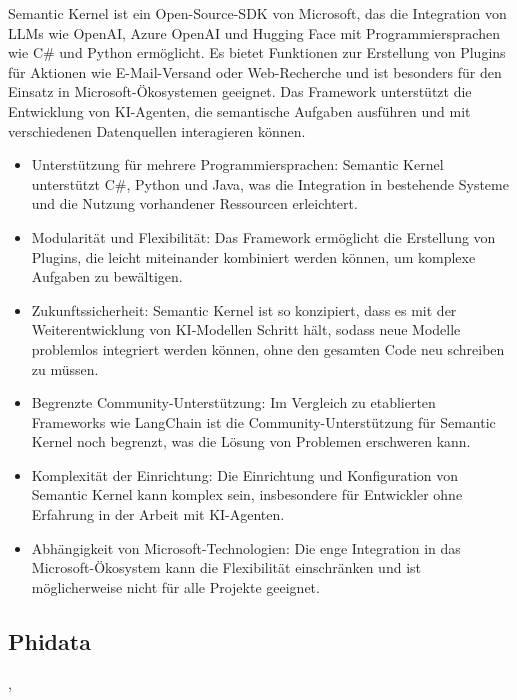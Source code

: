 Semantic Kernel ist ein Open-Source-SDK von Microsoft, das die Integration von LLMs wie OpenAI, Azure OpenAI und Hugging Face mit Programmiersprachen wie C\# und Python ermöglicht. Es bietet Funktionen zur Erstellung von Plugins für Aktionen wie E-Mail-Versand oder Web-Recherche und ist besonders für den Einsatz in Microsoft-Ökosystemen geeignet. Das Framework unterstützt die Entwicklung von KI-Agenten, die semantische Aufgaben ausführen und mit verschiedenen Datenquellen interagieren können.

\begin{itemize}
    \item Unterstützung für mehrere Programmiersprachen: Semantic Kernel unterstützt C\#, Python und Java, was die Integration in bestehende Systeme und die Nutzung vorhandener Ressourcen erleichtert.

    \item Modularität und Flexibilität: Das Framework ermöglicht die Erstellung von Plugins, die leicht miteinander kombiniert werden können, um komplexe Aufgaben zu bewältigen.

    \item Zukunftssicherheit: Semantic Kernel ist so konzipiert, dass es mit der Weiterentwicklung von KI-Modellen Schritt hält, sodass neue Modelle problemlos integriert werden können, ohne den gesamten Code neu schreiben zu müssen.
\end{itemize}

\begin{itemize}
    \item Begrenzte Community-Unterstützung: Im Vergleich zu etablierten Frameworks wie LangChain ist die Community-Unterstützung für Semantic Kernel noch begrenzt, was die Lösung von Problemen erschweren kann.

    \item Komplexität der Einrichtung: Die Einrichtung und Konfiguration von Semantic Kernel kann komplex sein, insbesondere für Entwickler ohne Erfahrung in der Arbeit mit KI-Agenten.

    \item Abhängigkeit von Microsoft-Technologien: Die enge Integration in das Microsoft-Ökosystem kann die Flexibilität einschränken und ist möglicherweise nicht für alle Projekte geeignet.
\end{itemize}


\subsection{Phidata}\cite{phidata_introduction},\cite{phidata_vs_langchain_comparison}

